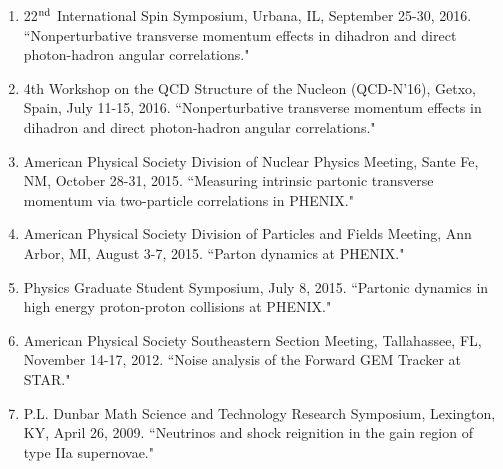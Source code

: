 \documentclass[11pt]{article}
\begin{document}
\begin{flushleft}
\begin{enumerate}
		
		\item 22$^{\rm nd}$ International Spin Symposium, Urbana, IL, September 25-30, 2016. ``Nonperturbative transverse momentum effects in dihadron and direct photon-hadron angular correlations."
		
		\item 4th Workshop on the QCD Structure of the Nucleon (QCD-N'16), Getxo, Spain, July 11-15, 2016. ``Nonperturbative transverse momentum effects in dihadron and direct photon-hadron angular correlations."
		
		\item American Physical Society Division of Nuclear Physics Meeting, Sante Fe, NM, October 28-31, 2015. ``Measuring intrinsic partonic transverse momentum via two-particle correlations in PHENIX."
		
		\item American Physical Society Division of Particles and Fields Meeting, Ann Arbor, MI, August 3-7, 2015. ``Parton dynamics at PHENIX." 
		
		\item Physics Graduate Student Symposium, July 8, 2015.  ``Partonic dynamics in high energy proton-proton collisions at PHENIX." 
		
		\item American Physical Society Southeastern Section Meeting, Tallahassee, FL, November 14-17, 2012.  ``Noise analysis of the Forward GEM Tracker at STAR." 
		
		\item P.L. Dunbar Math Science and Technology Research Symposium, Lexington, KY, April 26, 2009. ``Neutrinos and shock reignition in the gain region of type IIa supernovae."
	\end{enumerate}
	
\end{flushleft}

\vspace{7pt}




\end{document}
